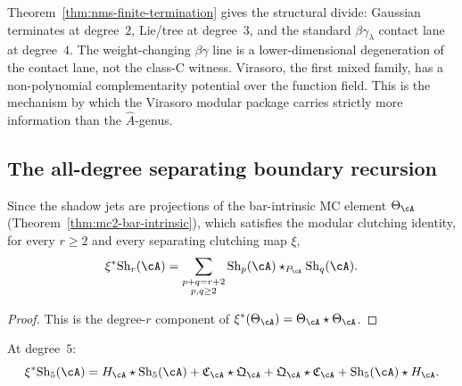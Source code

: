 \begin{remark}
\label{rem:nms-virasoro-infinite-tower}
Theorem~\ref{thm:nms-finite-termination} gives the structural divide:
Gaussian terminates at degree~$2$, Lie/tree at degree~$3$, and the
standard $\beta\gamma_\lambda$ contact lane at degree~$4$. The
weight-changing $\beta\gamma$ line is a lower-dimensional degeneration
of the contact lane, not the class-C witness. Virasoro, the first mixed
family, has a non-polynomial complementarity potential over the
function field. This is the
mechanism by which the Virasoro modular package carries strictly more
information than the $\hat{A}$-genus.
\end{remark}

\subsection{The all-degree separating boundary recursion}
\label{subsec:nms-all-degree-separating}

\begin{theorem}
\label{thm:nms-all-degree-separating-boundary}
Since the shadow jets are projections of the bar-intrinsic MC element $\Theta_\cA$ \textup{(}Theorem~\textup{\ref{thm:mc2-bar-intrinsic})}, which satisfies the modular clutching identity, for every $r\ge 2$ and every separating clutching map $\xi$,
\begin{equation}
\label{eq:nms-all-degree-separating}
\xi^*\mathrm{Sh}_r(\cA)
=
\sum_{\substack{p+q=r+2 \\ p,q\ge 2}}
\mathrm{Sh}_p(\cA)\star_{P_{\cA}}\mathrm{Sh}_q(\cA).
\end{equation}
\end{theorem}

\begin{proof}
This is the degree-$r$ component of $\xi^*(\Theta_{\cA})=\Theta_{\cA}\star\Theta_{\cA}$.\qedhere
\end{proof}

\begin{corollary}
\label{cor:nms-quintic-separating-boundary}
At degree~$5$:
\[
\xi^*\mathrm{Sh}_5(\cA)
=
H_{\cA}\star \mathrm{Sh}_5(\cA)
+
\mathfrak C_{\cA}\star \mathfrak Q_{\cA}
+
\mathfrak Q_{\cA}\star \mathfrak C_{\cA}
+
\mathrm{Sh}_5(\cA)\star H_{\cA}.
\]
\end{corollary}

